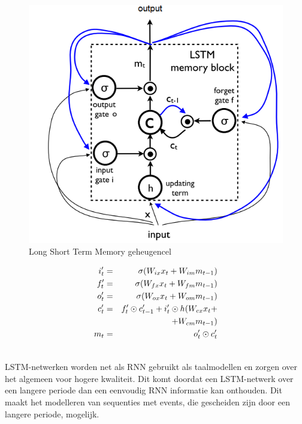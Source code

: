 \begin{figure}[tb]
    \centering
    \includegraphics[width=\linewidth]{Images/lstm.PNG}
    \caption{Long Short Term Memory geheugencel}
    \label{fig:lstm}
\end{figure}

\begin{eqnarray}
\vspace{-3mm}
\label{lstm-memory-start}
i_t' & = & \sigma (W_{ix} x_t + W_{im} m_{t-1}) \label{lstm-input} \\
f_t' & = & \sigma (W_{fx} x_t + W_{fm} m_{t-1}) \\
o_t' & = & \sigma (W_{ox} x_t + W_{om} m_{t-1}) \\
c_t' & = & f_t' \odot c_{t-1}' + i_t' \odot h(W_{cx} x_t + \nonumber \\
&   & + W_{cm} m_{t-1}) \\
m_t & = & o_t' \odot c_t'\\
\label{lstm-memory}
\vspace{-3mm}
\end{eqnarray}

LSTM-netwerken worden net als RNN gebruikt als taalmodellen en zorgen over het algemeen voor hogere kwaliteit. Dit komt doordat een LSTM-netwerk over een langere periode dan een eenvoudig RNN informatie kan onthouden. Dit maakt het modelleren van sequenties met events, die gescheiden zijn door een langere periode, mogelijk.


